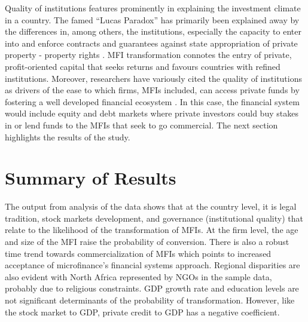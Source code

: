 \documentclass[a4paper, nobind]{templates/ociamthesis}
\begin{document}
Quality of institutions features prominently in explaining the investment climate in a country. The famed ``Lucas Paradox'' has primarily been explained away by the differences in, among others, the institutions, especially the capacity to enter into and enforce contracts and guarantees against state appropriation of private property - property rights \autocite{azemar2013has,goktan2015explanation}. MFI transformation connotes the entry of private, profit-oriented capital that seeks returns and favours countries with refined institutions. Moreover, researchers have variously cited the quality of institutions as drivers of the ease to which firms, MFIs included, can access private funds by fostering a well developed financial ecosystem \autocite{huang2010political,kaidi2019financial}. In this case, the financial system would include equity and debt markets where private investors could buy stakes in or lend funds to the MFIs that seek to go commercial. The next section highlights the results of the study.

\hypertarget{summary-of-results}{%
\section{Summary of Results}\label{summary-of-results}}

The output from analysis of the data shows that at the country level, it is legal tradition, stock markets development, and governance (institutional quality) that relate to the likelihood of the transformation of MFIs. At the firm level, the age and size of the MFI raise the probability of conversion. There is also a robust time trend towards commercialization of MFIs which points to increased acceptance of microfinance's financial systems approach. Regional disparities are also evident with North Africa represented by NGOs in the sample data, probably due to religious constraints. GDP growth rate and education levels are not significant determinants of the probability of transformation. However, like the stock market to GDP, private credit to GDP has a negative coefficient.
\end{document}
